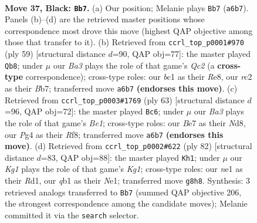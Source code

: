 \documentclass[11pt]{article}
\begin{document}
\clearpage

\begin{figure}[p]\centering
\begin{subfigure}{0.46\textwidth}\centering
\resizebox{\linewidth}{!}{%
\newchessgame
\chessboard[
  setfen={n1r3k1/p2qbrn1/b7/P1p2p1p/3p1Pp1/1P4P1/2R1P1BP/RQBNN1K1 b - - 7 37},
  showmover=false,
  pgfstyle=straightmove, color=movearrow, markmove={a6-b7}
]}
\caption{}
\end{subfigure}\hfill
\begin{subfigure}{0.46\textwidth}\centering
\resizebox{\linewidth}{!}{%
\newchessgame
\chessboard[
  setfen={3rr1k1/1bqnbpp1/pp1pp2p/8/P1PBPP2/1PN3PP/1Q1R2BK/3R4 b - - 18 30},
  showmover=false,
  pgfstyle=straightmove, color=movearrow, markmove={c7-b8}
]}
\caption{}
\end{subfigure}
\\[4pt]
\begin{subfigure}{0.46\textwidth}\centering
\resizebox{\linewidth}{!}{%
\newchessgame
\chessboard[
  setfen={3nbr2/2q3nk/1p2p1rp/p2p2p1/P1pP2B1/2P1R2P/2P2PPN/R1B1Q1K1 b - - 1 32},
  showmover=false,
  pgfstyle=straightmove, color=movearrow, markmove={e8-c6}
]}
\caption{}
\end{subfigure}\hfill
\begin{subfigure}{0.46\textwidth}\centering
\resizebox{\linewidth}{!}{%
\newchessgame
\chessboard[
  setfen={2rr1bk1/2q2p2/p1bpp2p/2p3pn/2P1P3/PP1R1P1P/N3Q1PB/3RN1K1 w - - 1 42},
  showmover=false,
  pgfstyle=straightmove, color=movearrow, markmove={g1-h1}
]}
\caption{}
\end{subfigure}
\caption{\textbf{Move 37, Black: \texttt{Bb7}.} (a) Our position; Melanie plays \texttt{Bb7} (\texttt{a6b7}). Panels (b)--(d) are the retrieved master positions whose correspondence most drove this move (highest QAP objective among those that transfer to it). (b) Retrieved from \texttt{ccrl\_top\_p0001\#970} (ply 59) [structural distance $d$=90, QAP obj=77]: the master played \texttt{Qb8}; under $\mu$ our \emph{Ba3} plays the role of that game's \emph{Qc2} (a \textbf{cross-type} correspondence); cross-type roles: our \emph{b}c1 as their \emph{R}e8, our \emph{r}c2 as their \emph{B}b7; transferred move \texttt{a6b7} \textbf{(endorses this move)}. (c) Retrieved from \texttt{ccrl\_top\_p0003\#1769} (ply 63) [structural distance $d$=96, QAP obj=72]: the master played \texttt{Bc6}; under $\mu$ our \emph{Ba3} plays the role of that game's \emph{Be1}; cross-type roles: our \emph{B}e7 as their \emph{N}d8, our \emph{P}g4 as their \emph{R}f8; transferred move \texttt{a6b7} \textbf{(endorses this move)}. (d) Retrieved from \texttt{ccrl\_top\_p0002\#622} (ply 82) [structural distance $d$=83, QAP obj=88]: the master played \texttt{Kh1}; under $\mu$ our \emph{Kg1} plays the role of that game's \emph{Kg1}; cross-type roles: our \emph{n}e1 as their \emph{R}d1, our \emph{q}b1 as their \emph{N}e1; transferred move \texttt{g8h8}. Synthesis: 3 retrieved analogs transferred to \texttt{Bb7} (summed QAP objective 206, the strongest correspondence among the candidate moves); Melanie committed it via the \texttt{search} selector.}
\label{fig:thought-m73}
\end{figure}
\end{document}
